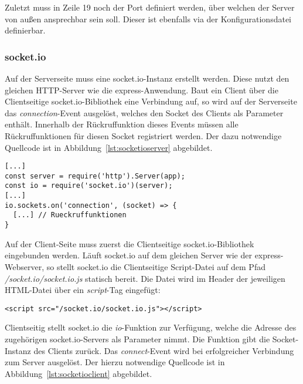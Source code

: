 Zuletzt muss in Zeile 19 noch der Port definiert werden, über welchen der Server von außen ansprechbar sein soll. Dieser ist ebenfalls via der Konfigurationsdatei definierbar.

\subsubsection{socket.io}
Auf der Serverseite muss eine socket.io-Instanz erstellt werden. Diese nutzt den gleichen \acs{HTTP}-Server wie die express-Anwendung. Baut ein Client über die Clientseitige socket.io-Bibliothek eine Verbindung auf, so wird auf der Serverseite das \textit{connection}-Event ausgelöst, welches den Socket des Clients als Parameter enthält. Innerhalb der Rückruffunktion dieses Events müssen alle Rückruffunktionen für diesen Socket registriert werden. Der dazu notwendige Quellcode ist in Abbildung~\ref{lst:socketioserver} abgebildet.

\vspace{5pt}
\lstset{language=js, style=STYLE_CODE_JS}
\begin{minipage}{\textwidth}
\begin{singlespace}
\begin{lstlisting}[caption={Initialisierung des socket.io Servers -- Server.js}, captionpos=b, label={lst:socketioserver}]
[...]
const server = require('http').Server(app);
const io = require('socket.io')(server);
[...]
io.sockets.on('connection', (socket) => {
  [...] // Rueckruffunktionen
}
\end{lstlisting}
\end{singlespace}
\end{minipage}

Auf der Client-Seite muss zuerst die Clientseitige socket.io-Bibliothek eingebunden werden. Läuft socket.io auf dem gleichen Server wie der express-Webserver, so stellt socket.io die Clientseitige Script-Datei auf dem Pfad \textit{/socket.io/socket.io.js} statisch bereit. Die Datei wird im Header der jeweiligen \acs{HTML}-Datei über ein \textit{script}-Tag eingefügt:
\lstset{style=STYLE_COMMAND_LINE_ARGUMENT_SINGLE_LINE}
\begin{lstlisting}[belowskip=-0.8 \baselineskip]
<script src="/socket.io/socket.io.js"></script>
\end{lstlisting}
\par

\vspace{11pt}
Clientseitig stellt socket.io die \textit{io}-Funktion zur Verfügung, welche die Adresse des zugehörigen socket.io-Servers als Parameter nimmt. Die Funktion gibt die Socket-Instanz des Clients zurück. Das \textit{connect}-Event wird bei erfolgreicher Verbindung zum Server ausgelöst. Der hierzu notwendige Quellcode ist in Abbildung~\ref{lst:socketioclient} abgebildet.

